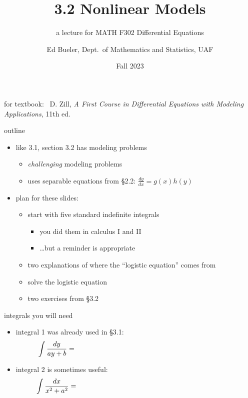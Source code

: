 \documentclass[colorlinks]{beamer}
\title{3.2 Nonlinear Models}
\subtitle{a lecture for MATH F302 Differential Equations}
\author{Ed Bueler, Dept.~of Mathematics and Statistics, UAF}
\date{Fall 2023}
\begin{document}


\begin{frame}
\titlepage

\centerline{\tiny for textbook: \, D. Zill, \emph{A First Course in Differential Equations with Modeling Applications}, 11th ed.}
\end{frame}


\begin{frame}{outline}

\begin{itemize}
\item like 3.1, section 3.2 has modeling problems
    \begin{itemize}
    \item \emph{challenging} modeling problems
    \item uses separable equations from \S2.2: $\frac{dy}{dx} = g(x) h(y)$
    \end{itemize}
\item plan for these slides:
    \begin{itemize}
    \item start with five standard indefinite integrals
        \begin{itemize}
        \item you did them in calculus I and II
        \item \dots but a reminder is appropriate
        \end{itemize}
    \item two explanations of where the ``logistic equation'' comes from
    \item solve the logistic equation
    \item two exercises from \S3.2
    \end{itemize} 
\end{itemize}
\end{frame}


\begin{frame}{integrals you will need}

\begin{itemize}
\item {\color{blue} integral 1} was already used in \S3.1:
    $$\int \frac{dy}{ay+b} = \hspace{80mm}$$

\vspace{10mm}
\item {\color{blue} integral 2} is sometimes useful:
    $$\int \frac{dx}{x^2+a^2} = \hspace{80mm}$$

\vspace{25mm}
\end{itemize}
\end{frame}
\end{document}
